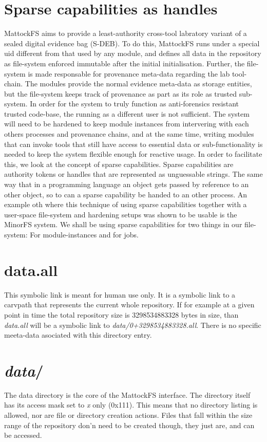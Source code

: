 \section{Sparse capabilities as handles}
MattockFS aims to provide a least-authority cross-tool labratory variant of a sealed digital evidence bag (S-DEB). To do this, MattockFS runs under a special uid different from that used by any module, and defines all data in the repository as file-system enforced immutable after the initial initialisation. Further, the file-system is made responsable for provenance meta-data regarding the lab tool-chain. The modules provide the normal evidence meta-data as storage entities, but the file-system keeps track of provenance as part as its role as trusted sub-system. In order for the system to truly function as anti-forensics resistant trusted code-base, the running as a different user is not sufficient. The system will need to be hardened to keep module instances from intervering with each others processes and provenance chains, and at the same time, writing modules that can invoke tools that still have access to essential data or sub-functionality is needed to keep the system flexible enough for reactive usage.
In order to facilitate this, we look at the concept of sparse capabilities. Sparse capabilities are authority tokens or handles that are represented as unguessable strings. The same way that in a programming language an object gets passed by reference to an other object, so to can a sparse capability be handed to an other process. An example oth where this technique of using sparse capabilities together with a user-space file-system and hardening setups was shown to be usable is the MinorFS system. We shall be using sparse capabilities for two things in our file-system: For module-instances and for jobs.  
\section{data.all}
This symbolic link is meant for human use only. It is a symbolic link to a carvpath that represents the current whole repository.
If for example at a given point in time the total repository size is 3298534883328 bytes in size, than \emph{data.all} will be a symbolic link to \emph{data/0+3298534883328.all}. There is no specific meeta-data asociated with this directory entry.
\section{\emph{data}/}
The data directory is the core of the MattockFS interface. The directory itself has its access mask set to \emph{x} only (0x111). This means that no directory listing is allowed, nor are file or directory creation actions. Files that fall within the size range of the repository don'n need to be created though, they just are, and can be accessed.
